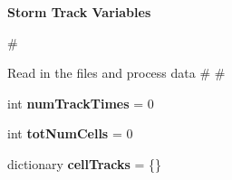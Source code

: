 \begin{Indent}{\bf Storm Track Variables}\par
{\em \begin{DoxyVerb}                                                                                                            #
\end{DoxyVerb}
 Read in the files and process data \# \# }\begin{DoxyCompactItemize}
\item 
\hypertarget{namespacebest__track_a07d46324ef63c0bfff52456eda9c875a}{int {\bfseries num\-Track\-Times} = 0}\label{namespacebest__track_a07d46324ef63c0bfff52456eda9c875a}

\item 
\hypertarget{namespacebest__track_a40be8307192f31ef39c26b001e671a51}{int {\bfseries tot\-Num\-Cells} = 0}\label{namespacebest__track_a40be8307192f31ef39c26b001e671a51}

\item 
\hypertarget{namespacebest__track_ad5140f5f7599009c796ec425a4794851}{dictionary {\bfseries cell\-Tracks} = \{\}}\label{namespacebest__track_ad5140f5f7599009c796ec425a4794851}

\end{DoxyCompactItemize}
\end{Indent}
